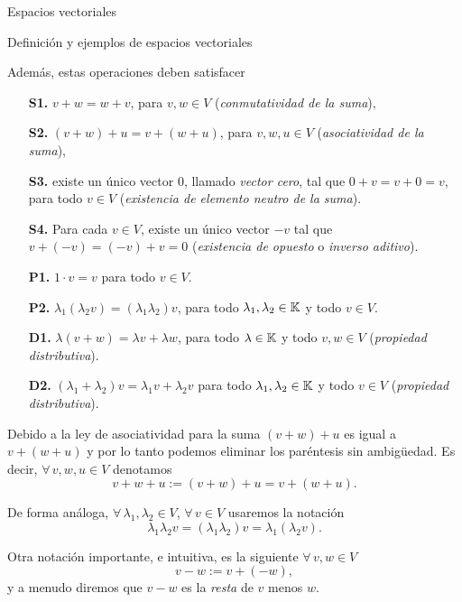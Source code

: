 \begin{chapter}{Espacios vectoriales}
\begin{section}{Definici\'on y ejemplos de espacios vectoriales}
\begin{definicion}
\begin{enumerate}[label=\textit{\alph*)}, ref=\textit{\alph*)}]
                \end{enumerate}	 
                Además, estas operaciones deben satisfacer 
                \begin{enumerate}
                    \item[\textbf{S1.}] $v + w = w + v$, para $v,w \in V$ (\textit{conmutatividad de la suma}),
                    \item[\textbf{S2.}] $(v+ w)+ u = v + (w+u)$, para $v,w,u \in V$ (\textit{asociatividad de la suma}),
                    \item[\textbf{S3.}] existe un único vector $0$, llamado \textit{vector cero}, tal que $0+ v = v + 0 =v$, para todo $v \in V$ (\textit{existencia de elemento neutro de la suma}).
                    \item[\textbf{S4.}] Para cada $v \in V$, existe un  único vector $-v$ tal que  $v + (-v) = (-v)+ v =0$ (\textit{existencia de opuesto} o  \textit{inverso aditivo}).
                    \item[\textbf{P1.}] $1\cdot v=v$ para todo $v \in V$.
                    \item[\textbf{P2.}] $\lambda_1(\lambda_2v) = (\lambda_1\lambda_2)v$, para todo $\lambda_1,\lambda_2 \in \mathbb K$ y todo $v \in V$.
                    \item[\textbf{D1.}] $\lambda(v+w) = \lambda v +\lambda w$, para todo $\lambda \in \mathbb K$ y todo $v,w \in V$ (\textit{propiedad distributiva}).
                    \item[\textbf{D2.}] $(\lambda_1+\lambda_2)v = \lambda_1v + \lambda_2 v$ para todo $\lambda_1,\lambda_2 \in \mathbb K$ y todo $v \in V$ (\textit{propiedad distributiva}).
                \end{enumerate}
            \end{definicion}
            
            Debido a la ley de asociatividad para la suma $(v+w)+u$ es igual a $v+(w+u)$ y por lo tanto podemos eliminar los paréntesis sin ambigüedad. Es decir, 	$\forall\, v,w,u \in V$ denotamos 
            $$
            v + w + u := (v+w)+u =v+(w+u).
            $$
            
            De forma análoga, $\forall\, \lambda_1,\lambda_2 \in V$, $\forall \, v \in V$ usaremos la notación
            $$
            \lambda_1\lambda_2v  = (\lambda_1\lambda_2)v = \lambda_1(\lambda_2v).
            $$
            
            Otra notación importante, e intuitiva, es la siguiente	$\forall\, v,w \in V$
            $$
            v-w := v+(-w),
            $$
            y a menudo diremos que $v-w$ es la \textit{resta} de $v$ menos $w$. 
            

\end{section}
\end{chapter}
